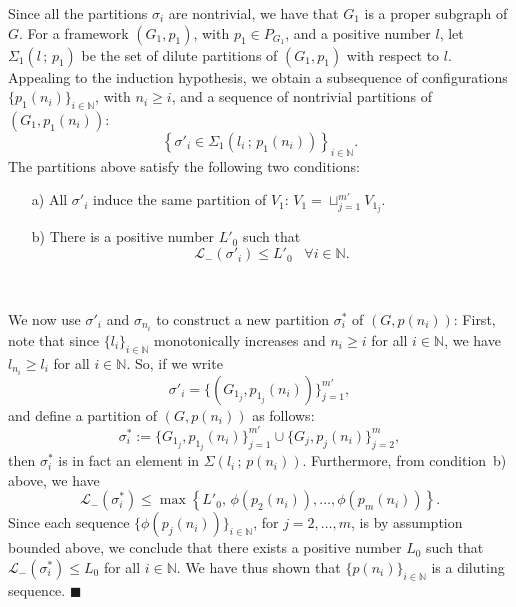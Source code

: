 \documentclass[10pt,twocolumn,twoside]{IEEEtran}
\renewcommand{\cal}{\mathcal}
\renewcommand{\(}{\left (}
\renewcommand{\)}{\right )}
\renewcommand{\;}{\,;\,}
\newcommand{\N}{\mathbb{N}}
\begin{document}
Since all the partitions $\sigma_i$ are nontrivial, we have that $G_1$ is a proper subgraph of $G$. 
For a framework $(G_1, p_1)$, with $p_1\in P_{G_1}$,  and a positive number $l$, let $\Sigma_1(l\; p_1)$ be the set of dilute partitions of $(G_1, p_1)$ with respect to $l$. Appealing to the induction hypothesis, we obtain a subsequence of configurations $\{p_1(n_i)\}_{i\in \N}$, with $n_i \ge i$, and a sequence of nontrivial partitions of $(G_1, p_1(n_i))$:   
$$\left \{\sigma'_i \in \Sigma_1(l_i\; p_1(n_i)) \right\}_{ i\in \N }.$$ 
The partitions above satisfy the following two conditions: 
\begin{enumerate}
\item[a)] All $\sigma'_i$ induce the same partition of $V_1$:  
$
V_1 = \sqcup^{m'}_{j = 1} V_{1_j}
$. 
\item[b)] There is a positive number $L'_0$ such that
$$
\cal{L}_-(\sigma'_i) \le L'_0 \hspace{10pt}
  \forall i\in\N.$$ 
\end{enumerate}\,

We now use $\sigma'_i$ and $\sigma_{n_i}$ to construct a new partition $\sigma_i^*$ of $(G, p(n_i))$:  
First, note that since $\{l_i\}_{i\in \N}$ monotonically increases and $n_i \ge i$ for all $i \in \N$, we have $ l_{n_i} \ge l_i$ for all $i\in\N$. So, if we write $$\sigma'_i = \{(G_{1_j}, p_{1_j}(n_i))\}^{m'}_{j = 1},$$ and define a partition of $(G,p(n_i))$ as follows:
$$
\sigma^*_i := \{G_{1_j}, p_{1_j}(n_i)\}^{m'}_{j = 1} \cup \{G_j, p_{j}(n_i)\}^{m}_{j = 2},
$$
then $\sigma^*_i$ is in fact an element in $\Sigma(l_i\; p(n_i))$. Furthermore,  from condition~b) above, we have
$$
\cal{L}_-(\sigma^*_i) \le \max \left\{ L'_0, \, \phi(p_2(n_i)),\ldots, \phi(p_m(n_i))\right\}.
$$
Since each sequence $\{\phi(p_j(n_i))\}_{i\in\N}$, for $j= 2,\ldots, m$, is by assumption bounded above, we conclude that there exists a positive number $L_0$ such that
$
\cal{L}_-(\sigma^*_i) \le L_0
$  for all  $i\in\N$. 
We have thus shown that $\{p(n_i)\}_{i\in \N}$ is a diluting sequence. \hfill{$\blacksquare$}
\end{document}
